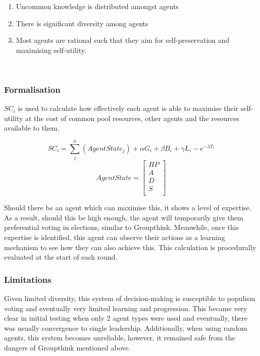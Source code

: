 \begin{enumerate}
    \item Uncommon knowledge is distributed amongst agents
    \item There is significant diversity among agents
    \item Most agents are rational such that they aim for self-preservation and maximising self-utility.
\end{enumerate}\\

\subsubsection{Formalisation}
$SC_i$ is used to calculate how effectively each agent is able to maximise their self-utility at the cost of common pool resources, other agents and the resources available to them. 


$$SC_i = \sum_{j}^{n} (AgentState_j) + \alpha G_i + \beta B_i + \gamma L_i - e^{-\lambda T_i}$$
$$ AgentState = 
\begin{bmatrix}
HP\\
A\\
D \\
S \\
\end{bmatrix}
$$

Should there be an agent which can maximise this, it shows a level of expertise. As a result, should this be high enough, the agent will temporarily give them preferential voting in elections, similar to Groupthink. Meanwhile, once this expertise is identified, this agent can observe their actions as a learning mechanism to see how they can also achieve this. This calculation is procedurally evaluated at the start of each round.

\subsubsection{Limitations}

Given limited diversity, this system of decision-making is susceptible to populism voting and eventually very limited learning and progression. This became very clear in initial testing when only 2 agent types were used and eventually, there was usually convergence to single leadership. Additionally, when using random agents, this system becomes unreliable, however, it remained safe from the dangers of Groupthink mentioned above.\\

